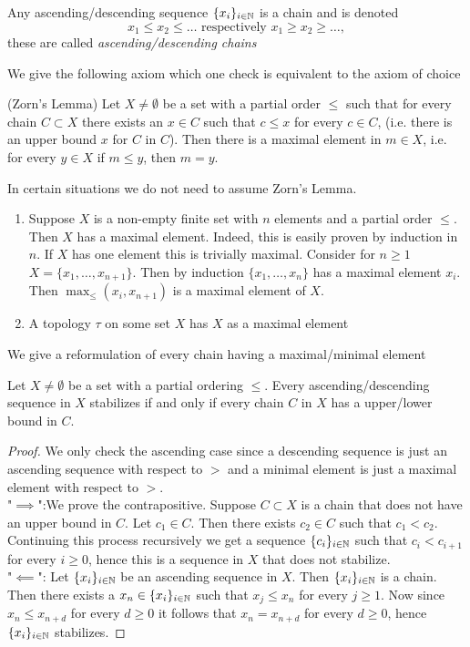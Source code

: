 \begin{remark}
    Any ascending/descending sequence $\{x_i\}_{i\in \mathbb{N}}$ is a chain and is denoted 
    $$x_1\leq x_2\leq \dots \text{ respectively } x_1\geq x_2 \geq \dots,$$
    these are called \textit{ascending/descending chains}
\end{remark}
We give the following axiom which one check is equivalent to the axiom of choice 
\begin{axioms}\label{ZornsLemma}(Zorn's Lemma)
    Let $X\neq \emptyset$ be a set with a partial order $\leq$ such that for every chain $C\subset X$ there exists an $x\in C$ such that $c\leq x$ for every $c\in C$, (i.e. there is an upper bound $x$ for $C$ in $C$). Then there is a maximal element in $m \in X$, i.e. for every $y \in X$ if $m\leq y$, then $m=y$.
\end{axioms}
\begin{example}
    In certain situations we do not need to assume Zorn's Lemma. 
    \begin{enumerate}
        \item Suppose $X$ is a non-empty finite set with $n$ elements and a partial order $\leq$. Then $X$ has a maximal element. Indeed, this is easily proven by induction in $n$. If $X$ has one element this is trivially maximal. Consider for $n\geq1$ $X= \{x_1,\dots,x_{n+1}\}$. Then by induction $\{x_1,\dots,x_n\}$ has a maximal element $x_i$. Then $\max_\leq(x_i,x_{n+1})$ is a maximal element of $X$. 
        \item A topology $\tau$ on some set $X$ has $X$ as a maximal element
    \end{enumerate}
     
\end{example}
We give a reformulation of every chain having a maximal/minimal element
\begin{lemma}\label{MaximalMinimalIsEquivalentToAscendingDescendingChainCondition}
    Let $X\neq \emptyset$ be a set with a partial ordering $\leq$. Every ascending/descending sequence in $X$ stabilizes if and only if every chain $C$ in $X$ has a upper/lower bound in $C$.
\end{lemma}
\begin{proof}
    We only check the ascending case since a descending sequence is just an ascending sequence with respect to $>$ and a minimal element is just a maximal element with respect to $>$.\\
    "$\implies$":We prove the contrapositive. Suppose $C\subset X$ is a chain that does not have an upper bound in $C$. Let $c_1\in C$. Then there exists $c_2 \in C$ such that $c_1 < c_2$. Continuing this process recursively we get a sequence $\{c_i\}_{i\in \mathbb{N}}$ such that $c_i<c_{i+1}$ for every $i\geq 0$, hence this is a sequence in $X$ that does not stabilize.\\
    "$\impliedby$": Let $\{x_i\}_{i\in \mathbb{N}}$ be an ascending sequence in $X$. Then $\{x_i\}_{i\in \mathbb{N}}$ is a chain. Then there exists a $x_n\in \{x_i\}_{i\in \mathbb{N}}$ such that $x_j\leq x_n$ for every $j\geq 1$. Now since $x_n \leq x_{n+d}$ for every $d\geq 0$ it follows that $x_n=x_{n+d}$ for every $d\geq0$, hence $\{x_i\}_{i\in \mathbb{N}}$ stabilizes. 
\end{proof}


